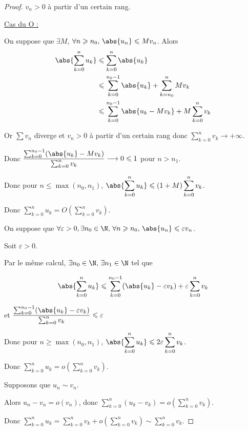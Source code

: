 \begin{proof} $v_n > 0$ à partir d'un certain rang.
    
    \uline{Cas du O : }

    \svspace On suppose que $\exists M$, $\forall n \geqslant n_0, \, \abs{u_n} \leqslant M v_n$.
    Alors \begin{align*}
        \abs{\sum_{k = 0 }^{n } u_k} & \leqslant \sum_{k=0 }^{n } \abs{u_k} \\
                                    & \leqslant \sum_{k = 0}^{n_0 - 1} \abs{u_k} + \sum_{k = n_0}^{n } M v_k \\
                                    & \leqslant \sum_{k = 0}^{n_0 - 1} \abs{u_k - M v_k} + M \sum_{k = 0}^{n } v_k \\
    \end{align*} 

    Or $\sum v_n$ diverge et $v_n > 0$ à partir d'un certain rang donc $\sum_{k = 0}^{n } v_k \longrightarrow + \infty$.

    \svspace Donc $\displaystyle \frac{\sum_{k = 0 }^{n_0 - 1} (\abs{u_k} - M v_k)}{ \sum_{k = 0}^n v_k} \longrightarrow 0 \leqslant 1$ pour $n > n_1$.

    \svspace Donc pour $\displaystyle n \leqslant \max(n_0, n_1)$, $\displaystyle \abs{\sum_{k = 0 }^{n } u_k} \leqslant \left( 1 + M \right) \sum_{k = 0}^{n } v_k$.

    Donc $\displaystyle \sum_{k = 0}^{n } u_k = O\left( \sum_{k = 0}^{n } v_k \right)$.


    \svspace On suppose que $\forall \varepsilon > 0, \exists n_0 \in \N, \, \forall n \geqslant n_0, \, \abs{u_n} \leqslant \varepsilon v_n$.

    Soit $\varepsilon > 0$. 

    Par le même calcul, $\exists n_0 \in \N, \, \exists n_1 \in \N$ tel que 

    $$\abs{\sum_{k = 0 }^{n } u_k} \leqslant \sum_{k = 0}^{n_0 - 1} (\abs{u_k} - \varepsilon v_k) + \varepsilon \sum_{k = 0}^{n } v_k$$

    et $\displaystyle \frac{\sum_{k = 0 }^{n_0 - 1} (\abs{u_k} - \varepsilon v_k)}{\sum_{k = 0}^{n } v_k} \leqslant \varepsilon$ 

    \svspace Donc pour $n \geqslant \max(n_0, n_1)$, $\displaystyle \abs{\sum_{k = 0 }^{n } u_k} \leqslant 2 \varepsilon \sum_{k = 0}^{n } v_k$.

    Donc $\displaystyle \sum_{k = 0}^{n } u_k = o\left( \sum_{k = 0}^{n } v_k \right)$.


    \svspace Supposons que $u_n \sim v_n$.

    Alors $\displaystyle u_n - v_n = o(v_n)$, donc $\displaystyle \sum_{k = 0}^{n } (u_k - v_k) = o\left( \sum_{k = 0}^{n } v_k \right)$.

    Donc $\displaystyle \sum_{k = 0}^{n } u_k = \sum_{k = 0}^{n } v_k + o\left( \sum_{k = 0}^{n } v_k \right) \sim \sum_{k = 0}^{n } v_k$.
\end{proof} 

